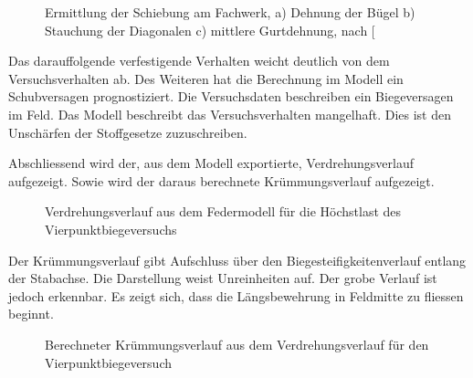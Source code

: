 \documentclass[
  11pt,
  letterpaper,
]{scrreprt}
\begin{document}
\begin{figure}[H]


\caption{\label{fig-schubverf_sigrist}Ermittlung der Schiebung am
Fachwerk, a) Dehnung der Bügel b) Stauchung der Diagonalen c) mittlere
Gurtdehnung, nach {[}\citeproc{ref-sigrist_zum_1995}{4}{]}}

\end{figure}%

Das darauffolgende verfestigende Verhalten weicht deutlich von dem
Versuchsverhalten ab. Des Weiteren hat die Berechnung im Modell ein
Schubversagen prognostiziert. Die Versuchsdaten beschreiben ein
Biegeversagen im Feld. Das Modell beschreibt das Versuchsverhalten
mangelhaft. Dies ist den Unschärfen der Stoffgesetze zuzuschreiben.

Abschliessend wird der, aus dem Modell exportierte, Verdrehungsverlauf
aufgezeigt. Sowie wird der daraus berechnete Krümmungsverlauf
aufgezeigt.

\begin{figure}[H]


\caption{\label{fig-phi-max-sv14}Verdrehungsverlauf aus dem Federmodell
für die Höchstlast des Vierpunktbiegeversuchs}

\end{figure}%

Der Krümmungsverlauf gibt Aufschluss über den Biegesteifigkeitenverlauf
entlang der Stabachse. Die Darstellung weist Unreinheiten auf. Der grobe
Verlauf ist jedoch erkennbar. Es zeigt sich, dass die Längsbewehrung in
Feldmitte zu fliessen beginnt.

\begin{figure}[H]


\caption{\label{fig-chi-max-sv14}Berechneter Krümmungsverlauf aus dem
Verdrehungsverlauf für den Vierpunktbiegeversuch}

\end{figure}%
\end{document}
